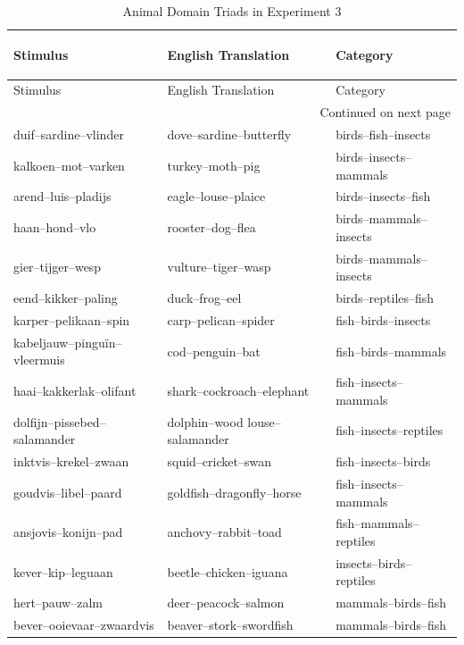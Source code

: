 \documentclass[doc]{apa6}
\begin{document}
\begin{appendix}
\clearpage
\begin{small}
\begin{longtable}{lll}
\caption{Animal Domain Triads in Experiment 3}\\
\label{table:AppendixAnimalsDomain}

Stimulus & English Translation  & Category\\
\toprule
\endfirsthead

Stimulus & English Translation  & Category\\
\toprule
\endhead

\bottomrule
\multicolumn{3}{r}{Continued on next page} \\
\endfoot

\bottomrule
\endlastfoot

duif--sardine--vlinder & dove--sardine--butterfly & birds--fish--insects \\
kalkoen--mot--varken & turkey--moth--pig & birds--insects--mammals \\
arend--luis--pladijs & eagle--louse--plaice & birds--insects--fish \\
haan--hond--vlo & rooster--dog--flea & birds--mammals--insects \\
gier--tijger--wesp & vulture--tiger--wasp & birds--mammals--insects \\
eend--kikker--paling & duck--frog--eel & birds--reptiles--fish \\
karper--pelikaan--spin & carp--pelican--spider & fish--birds--insects \\
kabeljauw--pingu{\"i}n--vleermuis & cod--penguin--bat & fish--birds--mammals \\
haai--kakkerlak--olifant & shark--cockroach--elephant & fish--insects--mammals \\
dolfijn--pissebed--salamander & dolphin--wood louse--salamander & fish--insects--reptiles \\
inktvis--krekel--zwaan & squid--cricket--swan & fish--insects--birds \\
goudvis--libel--paard & goldfish--dragonfly--horse & fish--insects--mammals \\
ansjovis--konijn--pad & anchovy--rabbit--toad & fish--mammals--reptiles \\
kever--kip--leguaan & beetle--chicken--iguana & insects--birds--reptiles \\
hert--pauw--zalm & deer--peacock--salmon & mammals--birds--fish \\
bever--ooievaar--zwaardvis & beaver--stork--swordfish & mammals--birds--fish \\

\end{longtable}
\end{small}
\end{appendix}
\end{document}
